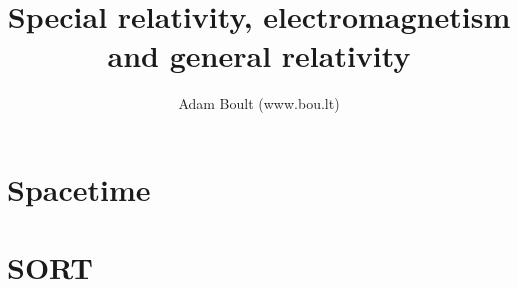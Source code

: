 \documentclass[oneside]{book}
\begin{document}
\author{Adam Boult (www.bou.lt)}
\title{Special relativity, electromagnetism and general relativity}
\maketitle

\setcounter{tocdepth}{0}
\tableofcontents



\part{Spacetime}


\part{SORT}

\end{document}
